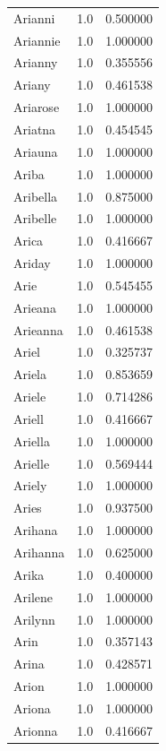 \documentclass[
  letterpaper,
  DIV=11,
  numbers=noendperiod]{scrreprt}
\begin{document}
\begin{tabular}{lrr}
Arianni         &   1.0 &   0.500000 \\
Ariannie        &   1.0 &   1.000000 \\
Arianny         &   1.0 &   0.355556 \\
Ariany          &   1.0 &   0.461538 \\
Ariarose        &   1.0 &   1.000000 \\
Ariatna         &   1.0 &   0.454545 \\
Ariauna         &   1.0 &   1.000000 \\
Ariba           &   1.0 &   1.000000 \\
Aribella        &   1.0 &   0.875000 \\
Aribelle        &   1.0 &   1.000000 \\
Arica           &   1.0 &   0.416667 \\
Ariday          &   1.0 &   1.000000 \\
Arie            &   1.0 &   0.545455 \\
Arieana         &   1.0 &   1.000000 \\
Arieanna        &   1.0 &   0.461538 \\
Ariel           &   1.0 &   0.325737 \\
Ariela          &   1.0 &   0.853659 \\
Ariele          &   1.0 &   0.714286 \\
Ariell          &   1.0 &   0.416667 \\
Ariella         &   1.0 &   1.000000 \\
Arielle         &   1.0 &   0.569444 \\
Ariely          &   1.0 &   1.000000 \\
Aries           &   1.0 &   0.937500 \\
Arihana         &   1.0 &   1.000000 \\
Arihanna        &   1.0 &   0.625000 \\
Arika           &   1.0 &   0.400000 \\
Arilene         &   1.0 &   1.000000 \\
Arilynn         &   1.0 &   1.000000 \\
Arin            &   1.0 &   0.357143 \\
Arina           &   1.0 &   0.428571 \\
Arion           &   1.0 &   1.000000 \\
Ariona          &   1.0 &   1.000000 \\
Arionna         &   1.0 &   0.416667 \\

\end{tabular}
\end{document}
